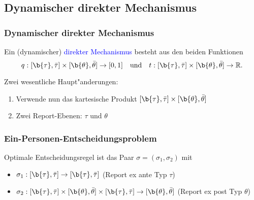 \subsection{Dynamischer direkter Mechanismus}
\begin{frame}
  \frametitle{Dynamischer direkter Mechanismus}
  \justifying
  \begin{thmD}
    Ein (dynamischer) \textcolor{blue}{direkter Mechanismus} besteht aus den beiden Funktionen
    \begin{equation*}
      q:[ \b{\tau} , \bar{\tau} ] \times [ \b{\theta} , \bar{\theta} ] \rightarrow [0,1]
      \quad \text{und} \quad
      t:[ \b{\tau} , \bar{\tau} ] \times [ \b{\theta} , \bar{\theta} ] \rightarrow \mathbb{R}.
    \end{equation*}
  \end{thmD}
  Zwei wesentliche Haupt"anderungen:
  \begin{enumerate}
    \item Verwende nun das kartesische Produkt $[ \b{\tau} , \bar{\tau} ] \times [ \b{\theta} , \bar{\theta} ]$
    \item Zwei Report-Ebenen: $\tau$ und $\theta$
  \end{enumerate}
\end{frame}

\begin{frame}
  \frametitle{Ein-Personen-Entscheidungsproblem}
  \justifying
  Optimale Entscheidungsregel ist das Paar $\sigma = (\sigma_{1}, \sigma_{2})$ mit
  \begin{itemize}
    \item $\sigma_{1}: [ \b{\tau} , \bar{\tau} ] \rightarrow [ \b{\tau} , \bar{\tau} ]$ (Report ex ante Typ $\tau$)
    \item $\sigma_{2}: [ \b{\tau} , \bar{\tau} ] \times [ \b{\theta} , \bar{\theta} ]
    \times [ \b{\tau} , \bar{\tau} ]  \rightarrow [ \b{\theta} , \bar{\theta} ]$ (Report ex post Typ $\theta$)
  \end{itemize}
\end{frame}

